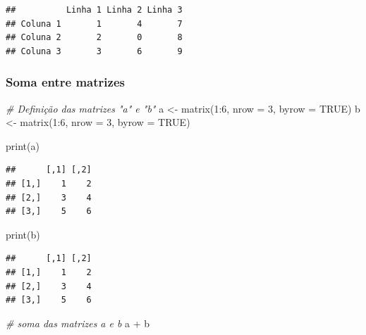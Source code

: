 \documentclass[
]{article}
\newenvironment{Shaded}{\begin{snugshade}}{\end{snugshade}}
\newcommand{\AttributeTok}[1]{\textcolor[rgb]{0.77,0.63,0.00}{#1}}
\newcommand{\CommentTok}[1]{\textcolor[rgb]{0.56,0.35,0.01}{\textit{#1}}}
\newcommand{\ConstantTok}[1]{\textcolor[rgb]{0.00,0.00,0.00}{#1}}
\newcommand{\DecValTok}[1]{\textcolor[rgb]{0.00,0.00,0.81}{#1}}
\newcommand{\FunctionTok}[1]{\textcolor[rgb]{0.00,0.00,0.00}{#1}}
\newcommand{\NormalTok}[1]{#1}
\newcommand{\OtherTok}[1]{\textcolor[rgb]{0.56,0.35,0.01}{#1}}
\newcommand{\SpecialCharTok}[1]{\textcolor[rgb]{0.00,0.00,0.00}{#1}}
\begin{document}
\begin{verbatim}
##          Linha 1 Linha 2 Linha 3
## Coluna 1       1       4       7
## Coluna 2       2       0       8
## Coluna 3       3       6       9
\end{verbatim}

\hypertarget{soma-entre-matrizes}{%
\subsubsection{\texorpdfstring{\textbf{Soma entre
matrizes}}{Soma entre matrizes}}\label{soma-entre-matrizes}}

\begin{Shaded}
\begin{Highlighting}[]
\CommentTok{\# Definição das matrizes "a" e "b"}
\NormalTok{a }\OtherTok{\textless{}{-}} \FunctionTok{matrix}\NormalTok{(}\DecValTok{1}\SpecialCharTok{:}\DecValTok{6}\NormalTok{, }\AttributeTok{nrow =} \DecValTok{3}\NormalTok{, }\AttributeTok{byrow =} \ConstantTok{TRUE}\NormalTok{)}
\NormalTok{b }\OtherTok{\textless{}{-}} \FunctionTok{matrix}\NormalTok{(}\DecValTok{1}\SpecialCharTok{:}\DecValTok{6}\NormalTok{, }\AttributeTok{nrow =} \DecValTok{3}\NormalTok{, }\AttributeTok{byrow =} \ConstantTok{TRUE}\NormalTok{)}

\FunctionTok{print}\NormalTok{(a)}
\end{Highlighting}
\end{Shaded}

\begin{verbatim}
##      [,1] [,2]
## [1,]    1    2
## [2,]    3    4
## [3,]    5    6
\end{verbatim}

\begin{Shaded}
\begin{Highlighting}[]
\FunctionTok{print}\NormalTok{(b)}
\end{Highlighting}
\end{Shaded}

\begin{verbatim}
##      [,1] [,2]
## [1,]    1    2
## [2,]    3    4
## [3,]    5    6
\end{verbatim}

\begin{Shaded}
\begin{Highlighting}[]
\CommentTok{\# soma das matrizes a e b}
\NormalTok{a }\SpecialCharTok{+}\NormalTok{ b}
\end{Highlighting}
\end{Shaded}
\end{document}
